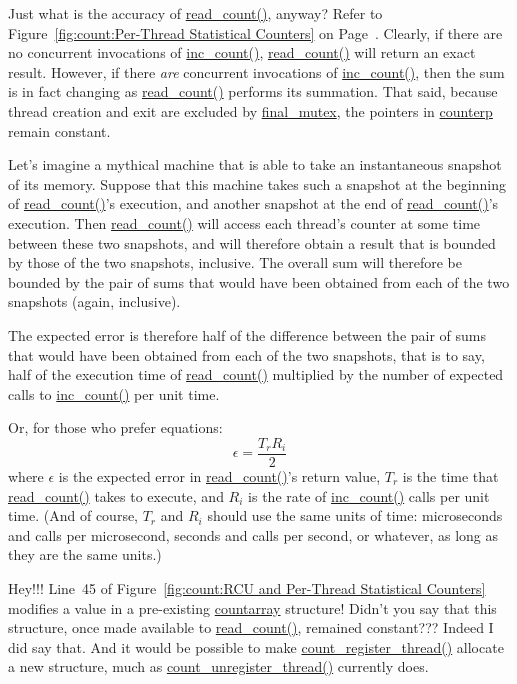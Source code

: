 \QuickQ{}
	Just what is the accuracy of \url{read_count()}, anyway?
\QuickA{}
	Refer to
	Figure~\ref{fig:count:Per-Thread Statistical Counters} on
	Page~\pageref{fig:count:Per-Thread Statistical Counters}.
	Clearly, if there are no concurrent invocations of \url{inc_count()},
	\url{read_count()} will return an exact result.
	However, if there \emph{are} concurrent invocations of
	\url{inc_count()}, then the sum is in fact changing as
	\url{read_count()} performs its summation.
	That said, because thread creation and exit are excluded by
	\url{final_mutex}, the pointers in \url{counterp} remain constant.

	Let's imagine a mythical machine that is able to take an
	instantaneous snapshot of its memory.
	Suppose that this machine takes such a snapshot at the
	beginning of \url{read_count()}'s execution, and another
	snapshot at the end of \url{read_count()}'s execution.
	Then \url{read_count()} will access each thread's counter
	at some time between these two snapshots, and will therefore
	obtain a result that is bounded by those of the two snapshots,
	inclusive.
	The overall sum will therefore be bounded by the pair of sums that
	would have been obtained from each of the two snapshots (again,
	inclusive).

	The expected error is therefore half of the difference between
	the pair of sums that would have been obtained from each of the
	two snapshots, that is to say, half of the execution time of
	\url{read_count()} multiplied by the number of expected calls to
	\url{inc_count()} per unit time.

	Or, for those who prefer equations:
	\begin{equation}
	\epsilon = \frac{T_r R_i}{2}
	\end{equation}
	where $\epsilon$ is the expected error in \url{read_count()}'s
	return value,
	$T_r$ is the time that \url{read_count()} takes to execute,
	and $R_i$ is the rate of \url{inc_count()} calls per unit time.
	(And of course, $T_r$ and $R_i$ should use the same units of
	time: microseconds and calls per microsecond, seconds and calls
	per second, or whatever, as long as they are the same units.)

\QuickQ{}
	Hey!!!
	Line~45 of
	Figure~\ref{fig:count:RCU and Per-Thread Statistical Counters}
	modifies a value in a pre-existing \url{countarray} structure!
	Didn't you say that this structure, once made available to
	\url{read_count()}, remained constant???
\QuickA{}
	Indeed I did say that.
	And it would be possible to make \url{count_register_thread()}
	allocate a new structure, much as \url{count_unregister_thread()}
	currently does.

